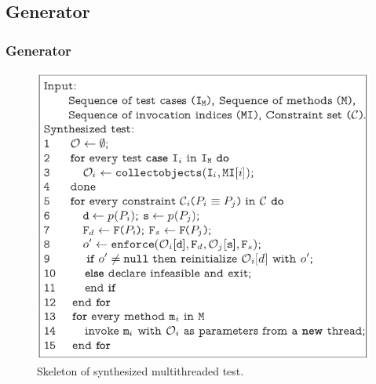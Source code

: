 \documentclass{beamer}
\begin{document}
\subsection{Generator}
\begin{frame}
\frametitle{Generator}
\begin{figure}[ht!]
     
           \includegraphics[scale = 0.3]{Images/skel.png}
       
    \caption{%
        Skeleton of synthesized multithreaded test.
     }%
   \label{fig:subfigures}
\end{figure}
\end{frame}
\end{document}
